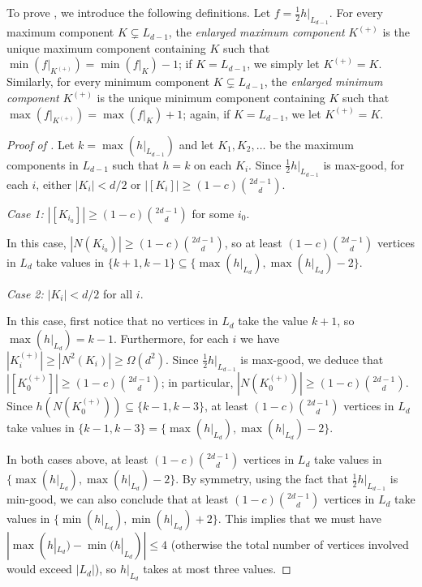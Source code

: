 \documentclass{amsart}
\theoremstyle{definition}
\newcommand{\sub}[0]{\subseteq}
\newcommand{\0}[0]{\emptyset}
\begin{document}
To prove , we introduce the following definitions. Let $f = \frac{1}{2}h|_{L_{d-1}}$. For every maximum component $K \subsetneq L_{d-1}$, the \textit{enlarged maximum component} $K^{(+)}$ is the unique maximum component containing $K$ such that $\min (f|_{K^{(+)}})=\min (f|_{K})-1$; if $K=L_{d-1}$, we simply let $K^{(+)}=K$. Similarly, for every minimum component $K \subsetneq L_{d-1}$, the \textit{enlarged minimum component} $K^{(+)}$ is the unique minimum component containing $K$ such that $\max (f|_{K^{(+)}})=\max (f|_{K})+1$; again, if $K=L_{d-1}$, we let $K^{(+)}=K$.

\begin{proof}[Proof of ]
    Let $k=\max (h|_{L_{d-1}})$ and let $K_1, K_2, \ldots$ be the maximum components in $L_{d-1}$ such that $h=k$ on each $K_i$. Since $\frac{1}{2}h|_{L_{d-1}}$ is max-good, for each $i$, either $|K_i|<d/2$ or $|[K_i]|\geq (1-c)\binom{2d-1}{d}$.

\noindent \textit{Case 1:} $|[K_{i_0}]|\geq (1-c)\binom{2d-1}{d}$ for some $i_0$.

In this case, $|N(K_{i_0})|\geq (1-c)\binom{2d-1}{d}$, so at least $(1-c)\binom{2d-1}{d}$ vertices in $L_d$ take values in $\{k+1,k-1\} \sub\{\max(h|_{L_d}),\max(h|_{L_d})-2\}$.

\noindent \textit{Case 2:} $|K_i|< d/2$ for all $i$. 

In this case, first notice that no vertices in $L_d$ take the value $k+1$, so $\max(h|_{L_d})=k-1$. Furthermore, for each $i$ we have $|K_i^{(+)}|\geq |N^2(K_i)|\geq  \Omega(d^2)$. Since $\frac{1}{2}h|_{L_{d-1}}$ is max-good, we deduce that $|[K_0^{(+)}]|\geq (1-c)\binom{2d-1}{d}$; in particular, $|N(K_0^{(+)})|\geq (1-c)\binom{2d-1}{d}$. Since $h(N(K_0^{(+)}))\subseteq \{k-1,k-3\}$, at least $(1-c)\binom{2d-1}{d}$ vertices in $L_{d}$ take values in $\{k-1,k-3\}=\{\max(h|_{L_d}),\max(h|_{L_d})-2\}$.
    
    In both cases above, at least $(1-c)\binom{2d-1}{d}$ vertices in $L_d$ take values in $\{\max(h|_{L_d}),\max(h|_{L_d})-2\}$. 
    By symmetry, using the fact that $\frac{1}{2}h|_{L_{d-1}}$ is min-good, we can also conclude that at least $(1-c)\binom{2d-1}{d}$ vertices in $L_{d}$ take values in $\{\min(h|_{L_d}),\min(h|_{L_d})+2\}$. This implies that we must have $|\max(h|_{L_d})-\min(h|_{L_d})|\le 4$ (otherwise the total number of vertices involved would exceed $|L_d|$), so $h|_{L_d}$ takes at most three values.
\end{proof}
\end{document}
